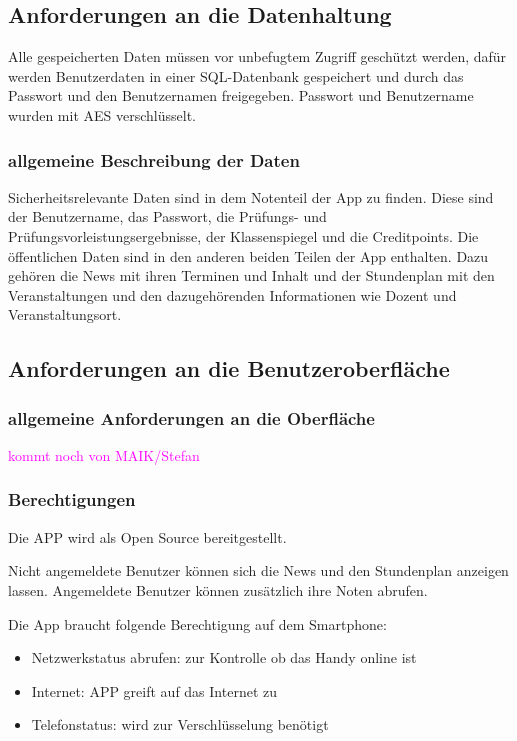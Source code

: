 \subsection{\textbf{Anforderungen an die Datenhaltung}}

Alle gespeicherten Daten müssen vor unbefugtem Zugriff geschützt werden, dafür werden Benutzerdaten in einer \acs{SQL}-Datenbank gespeichert und durch das Passwort und den Benutzernamen freigegeben. Passwort und Benutzername wurden mit \acs{AES} verschlüsselt.

\subsubsection{allgemeine Beschreibung der Daten}
Sicherheitsrelevante Daten sind in dem Notenteil der App zu finden. Diese sind der Benutzername, das Passwort, die Prüfungs- und Prüfungsvorleistungsergebnisse, der Klassenspiegel und die Creditpoints.
Die öffentlichen Daten sind in den anderen beiden Teilen der App enthalten.
Dazu gehören die News mit ihren Terminen und Inhalt und der Stundenplan mit den Veranstaltungen und den dazugehörenden Informationen wie Dozent und Veranstaltungsort.


\subsection{\textbf{Anforderungen an die Benutzeroberfläche}}



\subsubsection{allgemeine Anforderungen an die Oberfläche}
\textcolor{magenta}{kommt noch von MAIK/Stefan}




\subsubsection{Berechtigungen}

Die APP wird als Open Source bereitgestellt.

Nicht angemeldete Benutzer können sich die News und den Stundenplan anzeigen lassen. Angemeldete Benutzer können zusätzlich ihre Noten abrufen.

Die App braucht folgende Berechtigung auf dem Smartphone:
\begin{itemize}
	\item Netzwerkstatus abrufen: zur Kontrolle ob das Handy online ist
	\item Internet: APP greift auf das Internet zu
	\item Telefonstatus: wird zur Verschlüsselung benötigt
\end{itemize}




